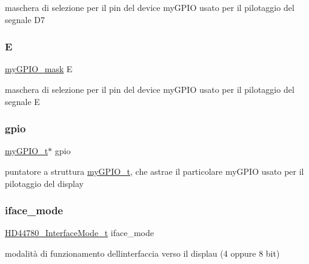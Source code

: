 maschera di selezione per il pin del device my\+G\+P\+IO usato per il pilotaggio del segnale D7 \mbox{\label{struct_h_d44780___l_c_d__t_aafe8aa696cf0ea45fd710809360b974a}} 
\subsubsection{\texorpdfstring{E}{E}}
{\footnotesize\ttfamily \hyperlink{group__bare-metal_ga402a0d20afc0cb7c25554b8b023f4253}{my\+G\+P\+I\+O\+\_\+mask} E}

maschera di selezione per il pin del device my\+G\+P\+IO usato per il pilotaggio del segnale E \mbox{\label{struct_h_d44780___l_c_d__t_ac37ddc7c58d246d233dfb38037020184}} 
\subsubsection{\texorpdfstring{gpio}{gpio}}
{\footnotesize\ttfamily \hyperlink{structmy_g_p_i_o__t}{my\+G\+P\+I\+O\+\_\+t}$\ast$ gpio}

puntatore a struttura \hyperlink{structmy_g_p_i_o__t}{my\+G\+P\+I\+O\+\_\+t}, che astrae il particolare my\+G\+P\+IO usato per il pilotaggio del display \mbox{\label{struct_h_d44780___l_c_d__t_a7c5a51b8cc5de5ee2cf42b884bd1bc67}} 
\subsubsection{\texorpdfstring{iface\+\_\+mode}{iface\_mode}}
{\footnotesize\ttfamily \hyperlink{group___h_d44780_gaaaea8b73e24f7658da4118f6b01b45f0}{H\+D44780\+\_\+\+Interface\+Mode\+\_\+t} iface\+\_\+mode}

modalità di funzionamento dell\textquotesingle{}interfaccia verso il displau (4 oppure 8 bit) \mbox{\label{struct_h_d44780___l_c_d__t_a120bc0a069f764630359d9655fe0c46d}} 
